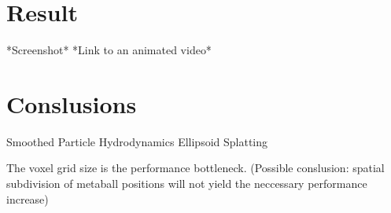 \documentclass{article}
\begin{document}
    \section{Result}
    *Screenshot*
    *Link to an animated video*

    \section{Conslusions}
    
    Smoothed Particle Hydrodynamics
    Ellipsoid Splatting

    The voxel grid size is the performance bottleneck.
    (Possible conslusion: spatial subdivision of metaball positions will not yield the neccessary performance increase)
\end{document}
